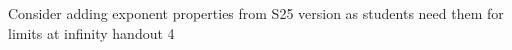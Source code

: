 Consider adding exponent properties from S25 version as students need them for limits at infinity handout 4